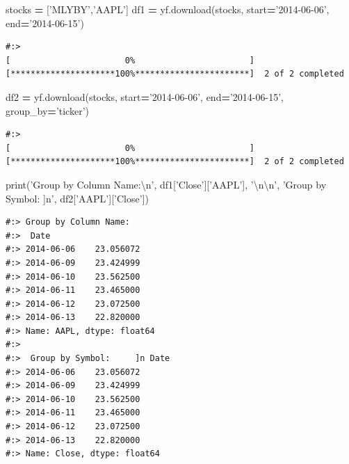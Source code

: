 \documentclass[
]{book}
\newenvironment{Shaded}{\begin{snugshade}}{\end{snugshade}}
\newcommand{\BuiltInTok}[1]{#1}
\newcommand{\CharTok}[1]{\textcolor[rgb]{0.5,0.5,0.5}{#1}}
\newcommand{\NormalTok}[1]{#1}
\newcommand{\OperatorTok}[1]{\textcolor[rgb]{0.43,0.43,0.43}{\textbf{#1}}}
\newcommand{\StringTok}[1]{\textcolor[rgb]{0.5,0.5,0.5}{#1}}
\begin{document}
\begin{Shaded}
\begin{Highlighting}[]
\NormalTok{stocks }\OperatorTok{=}\NormalTok{ [}\StringTok{'MLYBY'}\NormalTok{,}\StringTok{'AAPL'}\NormalTok{]}
\NormalTok{df1 }\OperatorTok{=}\NormalTok{ yf.download(stocks, start}\OperatorTok{=}\StringTok{'2014-06-06'}\NormalTok{, end}\OperatorTok{=}\StringTok{'2014-06-15'}\NormalTok{)}
\end{Highlighting}
\end{Shaded}

\begin{verbatim}
#:> 
[                       0%                       ]
[*********************100%***********************]  2 of 2 completed
\end{verbatim}

\begin{Shaded}
\begin{Highlighting}[]
\NormalTok{df2 }\OperatorTok{=}\NormalTok{ yf.download(stocks, start}\OperatorTok{=}\StringTok{'2014-06-06'}\NormalTok{, end}\OperatorTok{=}\StringTok{'2014-06-15'}\NormalTok{, group_by}\OperatorTok{=}\StringTok{'ticker'}\NormalTok{)}
\end{Highlighting}
\end{Shaded}

\begin{verbatim}
#:> 
[                       0%                       ]
[*********************100%***********************]  2 of 2 completed
\end{verbatim}

\begin{Shaded}
\begin{Highlighting}[]
\BuiltInTok{print}\NormalTok{(}\StringTok{'Group by Column Name:}\CharTok{\textbackslash{}n}\StringTok{'}\NormalTok{, df1[}\StringTok{'Close'}\NormalTok{][}\StringTok{'AAPL'}\NormalTok{], }\StringTok{'}\CharTok{\textbackslash{}n\textbackslash{}n}\StringTok{'}\NormalTok{,}
      \StringTok{'Group by Symbol:     ]n'}\NormalTok{, df2[}\StringTok{'AAPL'}\NormalTok{][}\StringTok{'Close'}\NormalTok{])}
\end{Highlighting}
\end{Shaded}

\begin{verbatim}
#:> Group by Column Name:
#:>  Date
#:> 2014-06-06    23.056072
#:> 2014-06-09    23.424999
#:> 2014-06-10    23.562500
#:> 2014-06-11    23.465000
#:> 2014-06-12    23.072500
#:> 2014-06-13    22.820000
#:> Name: AAPL, dtype: float64 
#:> 
#:>  Group by Symbol:     ]n Date
#:> 2014-06-06    23.056072
#:> 2014-06-09    23.424999
#:> 2014-06-10    23.562500
#:> 2014-06-11    23.465000
#:> 2014-06-12    23.072500
#:> 2014-06-13    22.820000
#:> Name: Close, dtype: float64
\end{verbatim}
\end{document}
